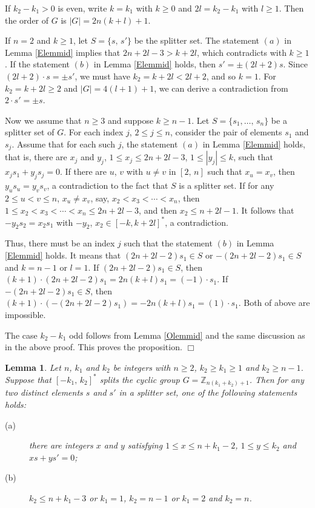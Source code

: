 \documentclass[12pt]{article}
\newtheorem{lem}{Lemma}[section]
\newtheorem{open problem}{Open problem}[section]
\newenvironment{proof}{\trivlist
      \item[\hskip\labelsep
      {\itshape Proof.}]\normalfont}
      {\hspace*{\fill}$\Box$\endtrivlist}
\begin{document}
\begin{proof}
If $k_2-k_1>0$ is even, write $k=k_1$ with $k\geq 0$ and $2l=k_2-k_1$ with $l\geq 1$.
Then the order of $G$ is $|G|=2n(k+l)+1$.

If $n=2$ and  $k\geq 1$, let $S=\{s, \,s'\}$ be the splitter set.
The statement $(a)$ in Lemma \ref{Elemmid} implies that $2n+2l-3>k+2l$, which  contradicts with $k\geq 1$.
If  the statement $(b)$ in Lemma \ref{Elemmid} holds,
then $s'=\pm(2l+2)s$.
Since $(2l+2)\cdot s=\pm s'$,
we must have $k_2=k+2l<2l+2$, and so $k=1$.
For $k_2=k+2l\geq 2$ and $|G|=4(l+1)+1$, we can derive a contradiction from $2\cdot s'=\pm s$.

Now we assume that $n\geq 3$ and suppose $k\geq n-1$.
Let $S=\{s_1, \ldots,  \,s_n\}$ be a splitter set of $G$.
For each index $j$, $2\leq j\leq n$, consider the pair of elements $s_1$ and $s_j$.
Assume that for each such $j$, the statement $(a)$ in Lemma \ref{Elemmid} holds,
that is, there are $x_j$ and $y_j$, $1\leq x_j\leq 2n+2l-3$, $1\leq |y_j|\leq k$, such that
$x_js_1+y_js_j=0$.
If there are $u$, $v$ with $u\neq v$ in $[2, \,n]$ such that $x_u=x_v$,
then $y_us_u=y_vs_v$, a contradiction to the fact that $S$ is a splitter set.
If for any $2\leq u<v\leq n$, $x_u\neq x_v$,
say, $x_2<x_3<\cdots <x_n$,
then $1\leq x_2<x_3<\cdots <x_n\leq 2n+2l-3$, and then $x_2\leq n+2l-1$.
It follows that $-y_2s_2=x_2s_1$ with $-y_2$, $x_2\in [-k,k+2l]^*$, a contradiction.

Thus, there must be an index $j$ such that the statement $(b)$ in Lemma \ref{Elemmid} holds.
It means that $(2n+2l-2)s_1\in S$ or $-(2n+2l-2)s_1\in S$ and $k=n-1$ or $l=1$.
If $(2n+2l-2)s_1\in S$, then $(k+1)\cdot (2n+2l-2)s_1=2n(k+l)s_1=(-1)\cdot s_1$.
If $-(2n+2l-2)s_1\in S$, then $(k+1)\cdot (-(2n+2l-2)s_1)=-2n(k+l)s_1=(1)\cdot s_1$.
Both of above are impossible.

The case $k_2-k_1$ odd follows from Lemma \ref{Olemmid} and the same discussion as in the above proof. This proves the proposition.
\end{proof}

\begin{lem}\label{thmk2}
Let $n$, $k_1$ and $k_2$ be integers with $n\geq 2$, $k_2\geq k_1\geq 1$ and $k_2\geq n-1$.
Suppose that $[-k_1, \,k_2]^*$ splits the cyclic  group $G=\mathbb{Z}_{n(k_1+k_2)+1}$.
Then for any two distinct elements $s$ and $s'$ in a splitter set,  one of the following statements holds:
\begin{description}
  \item[(a)] there are integers $x$ and $y$ satisfying $1\leq x\leq n+k_1-2$, $1\leq y\leq k_2$ and $xs+ys'=0$;
  \item[(b)] $k_2\leq n+k_1-3$ or $k_1=1$, $k_2=n-1$ or $k_1=2$ and $k_2=n$.
\end{description}
\end{lem}
\end{document}
